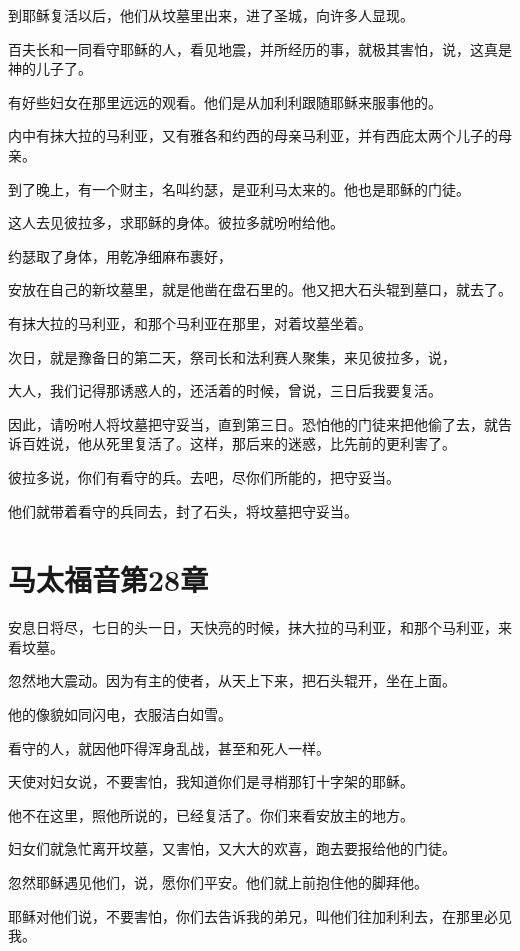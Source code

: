 \documentclass[12pt,oneside]{book}
\begin{document}
到耶稣复活以后，他们从坟墓里出来，进了圣城，向许多人显现。

百夫长和一同看守耶稣的人，看见地震，并所经历的事，就极其害怕，说，这真是神的儿子了。

有好些妇女在那里远远的观看。他们是从加利利跟随耶稣来服事他的。

内中有抹大拉的马利亚，又有雅各和约西的母亲马利亚，并有西庇太两个儿子的母亲。

到了晚上，有一个财主，名叫约瑟，是亚利马太来的。他也是耶稣的门徒。

这人去见彼拉多，求耶稣的身体。彼拉多就吩咐给他。

约瑟取了身体，用乾净细麻布裹好，

安放在自己的新坟墓里，就是他凿在盘石里的。他又把大石头辊到墓口，就去了。

有抹大拉的马利亚，和那个马利亚在那里，对着坟墓坐着。

次日，就是豫备日的第二天，祭司长和法利赛人聚集，来见彼拉多，说，

大人，我们记得那诱惑人的，还活着的时候，曾说，三日后我要复活。

因此，请吩咐人将坟墓把守妥当，直到第三日。恐怕他的门徒来把他偷了去，就告诉百姓说，他从死里复活了。这样，那后来的迷惑，比先前的更利害了。

彼拉多说，你们有看守的兵。去吧，尽你们所能的，把守妥当。

他们就带着看守的兵同去，封了石头，将坟墓把守妥当。

\chapter{马太福音第28章}
安息日将尽，七日的头一日，天快亮的时候，抹大拉的马利亚，和那个马利亚，来看坟墓。

忽然地大震动。因为有主的使者，从天上下来，把石头辊开，坐在上面。

他的像貌如同闪电，衣服洁白如雪。

看守的人，就因他吓得浑身乱战，甚至和死人一样。

天使对妇女说，不要害怕，我知道你们是寻梢那钉十字架的耶稣。

他不在这里，照他所说的，已经复活了。你们来看安放主的地方。

妇女们就急忙离开坟墓，又害怕，又大大的欢喜，跑去要报给他的门徒。

忽然耶稣遇见他们，说，愿你们平安。他们就上前抱住他的脚拜他。

耶稣对他们说，不要害怕，你们去告诉我的弟兄，叫他们往加利利去，在那里必见我。
\end{document}
